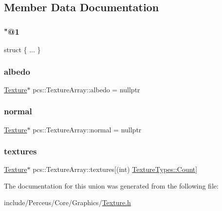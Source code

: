 \subsection{Member Data Documentation}
\mbox{\label{unionpcs_1_1TextureArray_ade823ca99be07a8759437430d9318235}} 
\subsubsection{\texorpdfstring{"@1}{@1}}
{\footnotesize\ttfamily struct \{ ... \} }

\mbox{\label{unionpcs_1_1TextureArray_ad2b4ebb3221d461406db106b1f186d1f}} 
\subsubsection{\texorpdfstring{albedo}{albedo}}
{\footnotesize\ttfamily \hyperlink{classpcs_1_1Texture}{Texture}$\ast$ pcs\+::\+Texture\+Array\+::albedo = nullptr}

\mbox{\label{unionpcs_1_1TextureArray_a70257f556ecd88b438daa286d5b2d3ce}} 
\subsubsection{\texorpdfstring{normal}{normal}}
{\footnotesize\ttfamily \hyperlink{classpcs_1_1Texture}{Texture}$\ast$ pcs\+::\+Texture\+Array\+::normal = nullptr}

\mbox{\label{unionpcs_1_1TextureArray_a04e4947ed39b82bc46eb4c5be4a5c361}} 
\subsubsection{\texorpdfstring{textures}{textures}}
{\footnotesize\ttfamily \hyperlink{classpcs_1_1Texture}{Texture}$\ast$ pcs\+::\+Texture\+Array\+::textures\mbox{[}(int) \hyperlink{namespacepcs_aff33aa4c1c94147ad9ade12bc60958d4ae93f994f01c537c4e2f7d8528c3eb5e9}{Texture\+Types\+::\+Count}\mbox{]}}



The documentation for this union was generated from the following file\+:\begin{DoxyCompactItemize}
\item 
include/\+Perceus/\+Core/\+Graphics/\hyperlink{Texture_8h}{Texture.\+h}\end{DoxyCompactItemize}
